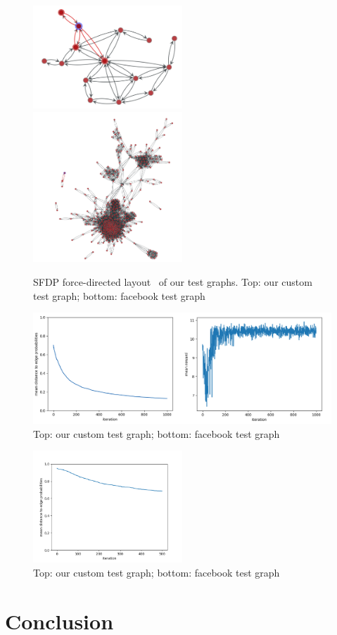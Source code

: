 \documentclass[a4paper,12pt]{article}
\begin{document}
 \begin{figure}
  \centering
    \includegraphics[width=0.5\textwidth]{test_graph.png}
        \includegraphics[width=0.5\textwidth]{facebook.png}
      \caption{SFDP force-directed layout~\cite{hu2005efficient} of our test graphs. Top: our custom test graph; bottom: facebook test graph}
        \label{fig:testgraph}
\end{figure}

 \begin{figure}
  \centering
    \includegraphics[width=\textwidth]{total_test.png}
      \caption{Top: our custom test graph; bottom: facebook test graph}
        \label{fig:testgraph}
\end{figure}


 \begin{figure}
  \centering
    \includegraphics[width=0.5\textwidth]{conv_weights_twitter.png}
      \caption{Top: our custom test graph; bottom: facebook test graph}
        \label{fig:testgraph}
\end{figure}



\section{Conclusion}

\newpage



\end{document}

